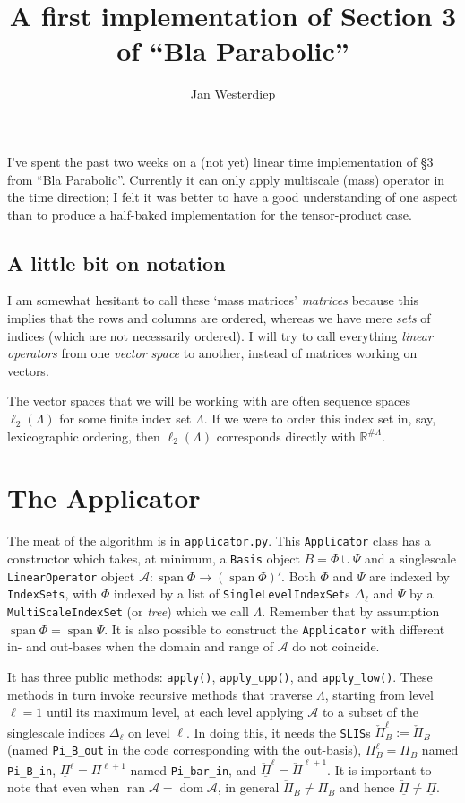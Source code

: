 \documentclass[11pt,a4paper]{amsart}
\theoremstyle{definition}
\DeclareMathOperator{\ran}{ran}
\DeclareMathOperator{\dom}{dom}
\DeclareMathOperator{\spann}{span}
\renewcommand{\span}{\spann}
\begin{document}
\title{A first implementation of Section 3 of ``Bla Parabolic''}
\author{Jan Westerdiep}
\maketitle

I've spent the past two weeks on a (not yet) linear time implementation of \S 3
from ``Bla Parabolic''. Currently it can only apply multiscale (mass) operator
in the time direction; I felt it was better to have a good understanding of one
aspect than to produce a half-baked implementation for the tensor-product case.

\subsection*{A little bit on notation} I am somewhat hesitant to call these
`mass matrices' \emph{matrices} because this implies that the rows and columns
are ordered, whereas we have mere \emph{sets} of indices (which are not necessarily
ordered). I will try to call everything \emph{linear operators} from one
\emph{vector space} to another, instead of matrices working on vectors.

The vector spaces that we will be working with are often sequence spaces
$\ell_2(\Lambda)$ for some finite index set $\Lambda$. If we were to order this
index set in, say, lexicographic ordering, then $\ell_2(\Lambda)$ corresponds
directly with $\mathbb{R}^{\# \Lambda}$.

\section{The Applicator}
The meat of the algorithm is in \texttt{applicator.py}. This \texttt{Applicator}
class has a constructor which takes, at minimum, a \texttt{Basis} object
$B = \Phi \cup \Psi$ and a singlescale \texttt{LinearOperator} object
$\mathcal A: \span \Phi \to (\span \Phi)'$. Both $\Phi$ and $\Psi$ are indexed by
\texttt{IndexSets}, with $\Phi$ indexed by a list of \texttt{SingleLevelIndexSet}s
$\Delta_\ell$ and $\Psi$ by a \texttt{MultiScaleIndexSet} (or \emph{tree})
which we call $\Lambda$. Remember that by assumption $\span \Phi = \span \Psi$.
It is also possible to construct the \texttt{Applicator} with different in- and
out-bases when the domain and range of $\mathcal A$ do not coincide.

It has three public methods: \texttt{apply()}, \texttt{apply\_upp()},
and \texttt{apply\_low()}. These methods in turn invoke recursive methods that
traverse $\Lambda$, starting from level $\ell=1$ until its maximum level, at
each level applying $\mathcal A$ to a subset of the singlescale indices
$\Delta_\ell$ on level $\ell$. In doing this, it needs the \texttt{SLIS}s
$\check \Pi_B^\ell := \check \Pi_B$ (named \texttt{Pi\_B\_out} in the code
corresponding with the out-basis), $\Pi_B^\ell = \Pi_B$ named
\texttt{Pi\_B\_in}, $\underline \Pi^\ell = \Pi^{\ell + 1}$ named \texttt{Pi\_bar\_in},
and $\underline{\check \Pi}^\ell = \check \Pi^{\ell+1}$. It is important to note 
that even when $\ran \mathcal A = \dom \mathcal A$, in general $\check \Pi_B \not= \Pi_B$
and hence $\underline{\check \Pi} \not= \underline \Pi$.
\end{document}
